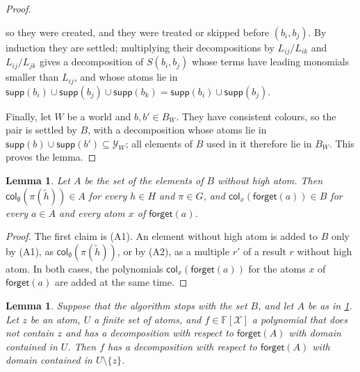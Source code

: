 \documentclass[12pt,a4paper,article]{memoir}
\newcommand{\struct}{\mathcal{X}}
\newcommand{\F}{\mathbb{F}}
\newcommand{\poly}[2]{#1[#2]}
\newcommand{\supp}{\mathsf{supp}}
\newcommand{\col}{\mathsf{col}}
\newcommand{\forget}{\mathsf{forget}}
\newtheorem{lemma}[theorem]{Lemma}
\theoremstyle{definition}
\begin{document}
\begin{proof}
\begin{itemize}
so they were created, and they were treated or skipped before $(b_i, b_j)$.
By induction they are settled; multiplying their decompositions by $L_{ij}/L_{ik}$ and $L_{ij}/L_{jk}$
gives a decomposition of $S(b_i, b_j)$ whose terms have leading monomials smaller than $L_{ij}$,
and whose atoms lie in $\supp(b_i) \cup \supp(b_j) \cup \supp(b_k) = \supp(b_i) \cup \supp(b_j)$.
\end{itemize}
Finally, let $W$ be a world and $b, b' \in B_W$.
They have consistent colours, so the pair is settled by $B$, with a decomposition whose atoms lie in
$\supp(b) \cup \supp(b') \subseteq \mathcal{Y}_W$; all elements of $B$ used in it therefore lie in $B_W$.
This proves the lemma.
\end{proof}

\begin{lemma}\label{lem:closure}
Let $A$ be the set of the elements of $B$ without high atom.
Then $\col_\emptyset(\pi(\tilde h)) \in A$ for every $h \in H$ and $\pi \in G$,
and $\col_x(\forget(a)) \in B$ for every $a \in A$ and every atom $x$ of $\forget(a)$.
\end{lemma}

\begin{proof}
The first claim is (A1).
An element without high atom is added to $B$ only by (A1), as $\col_\emptyset(\pi(\tilde h))$,
or by (A2), as a multiple $r'$ of a result $r$ without high atom.
In both cases, the polynomials $\col_x(\forget(a))$ for the atoms $x$ of $\forget(a)$ are added at the same time.
\end{proof}

\begin{lemma}\label{lem:elimination}
Suppose that the algorithm stops with the set $B$, and let $A$ be as in \cref{lem:closure}.
Let $z$ be an atom, $U$ a finite set of atoms,
and $f \in \poly{\F}{\struct}$ a polynomial that does not contain $z$
and has a decomposition with respect to $\forget(A)$ with domain contained in $U$.
Then $f$ has a decomposition with respect to $\forget(A)$ with domain contained in $U \setminus \{z\}$.
\end{lemma}
\end{document}
